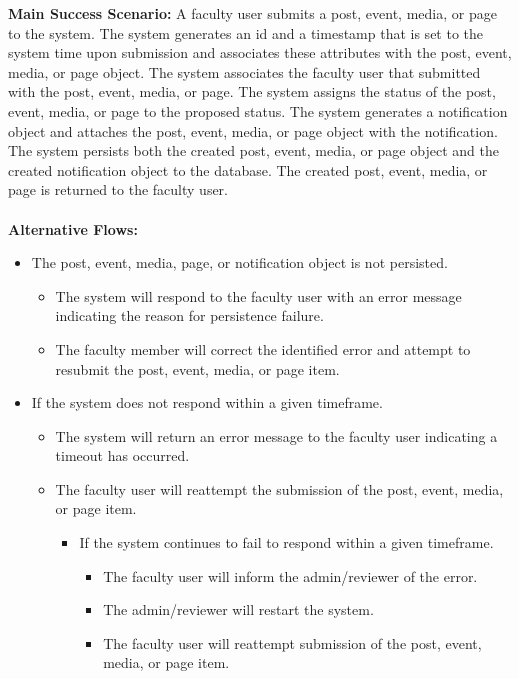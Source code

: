 \textbf{Main Success Scenario:} A faculty user submits a post, event, media, or page to the system. The system generates an id and a timestamp that is set to the system time upon submission and associates these attributes with the post, event, media, or page object. The system associates the faculty user that submitted with the post, event, media, or page. The system assigns the status of the post, event, media, or page to the proposed status. The system generates a notification object and attaches the post, event, media, or page object with the notification. The system persists both the created post, event, media, or page object and the created notification object to the database. The created post, event, media, or page is returned to the faculty user. \\
\\
\textbf{Alternative Flows:}
\begin{itemize}
    \item The post, event, media, page, or notification object is not persisted.
    \begin{itemize}
        \item The system will respond to the faculty user with an error message indicating the reason for persistence failure.
        \item The faculty member will correct the identified error and attempt to resubmit the post, event, media, or page item.
    \end{itemize}
    \item If the system does not respond within a given timeframe.
    \begin{itemize}
        \item The system will return an error message to the faculty user indicating a timeout has occurred.
        \item The faculty user will reattempt the submission of the post, event, media, or page item.
        \begin{itemize}
            \item If the system continues to fail to respond within a given timeframe.
            \begin{itemize}
                \item The faculty user will inform the admin/reviewer of the error.
                \item The admin/reviewer will restart the system.
                \item The faculty user will reattempt submission of the post, event, media, or page item.
            \end{itemize}
        \end{itemize}
    \end{itemize}
\end{itemize}

